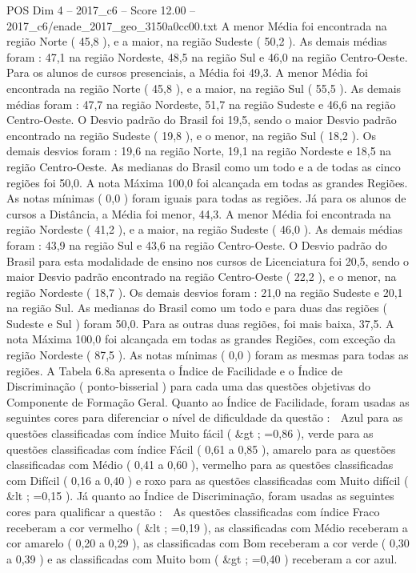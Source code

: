 \begin{textsample}{POS Dim 4 – 2017\_c6 – Score 12.00 – 2017\_c6/enade\_2017\_geo\_3150a0cc00.txt}
A menor Média foi encontrada na região Norte ( 45,8 ), e a maior, na região Sudeste ( 50,2 ).
As demais médias foram : 47,1 na região Nordeste, 48,5 na região Sul e 46,0 na região Centro-Oeste.
Para os alunos de cursos presenciais, a Média foi 49,3.
A menor Média foi encontrada na região Norte ( 45,8 ), e a maior, na região Sul ( 55,5 ).
As demais médias foram : 47,7 na região Nordeste, 51,7 na região Sudeste e 46,6 na região Centro-Oeste.
O Desvio padrão do Brasil foi 19,5, sendo o maior Desvio padrão encontrado na região Sudeste ( 19,8 ), e o menor, na região Sul ( 18,2 ).
Os demais desvios foram : 19,6 na região Norte, 19,1 na região Nordeste e 18,5 na região Centro-Oeste.
As medianas do Brasil como um todo e a de todas as cinco regiões foi 50,0.
A nota Máxima 100,0 foi alcançada em todas as grandes Regiões.
As notas mínimas ( 0,0 ) foram iguais para todas as regiões.
Já para os alunos de cursos a Distância, a Média foi menor, 44,3.
A menor Média foi encontrada na região Nordeste ( 41,2 ), e a maior, na região Sudeste ( 46,0 ).
As demais médias foram : 43,9 na região Sul e 43,6 na região Centro-Oeste.
O Desvio padrão do Brasil para esta modalidade de ensino nos cursos de Licenciatura foi 20,5, sendo o maior Desvio padrão encontrado na região Centro-Oeste ( 22,2 ), e o menor, na região Nordeste ( 18,7 ).
Os demais desvios foram : 21,0 na região Sudeste e 20,1 na região Sul.
As medianas do Brasil como um todo e para duas das regiões ( Sudeste e Sul ) foram 50,0.
Para as outras duas regiões, foi mais baixa, 37,5.
A nota Máxima 100,0 foi alcançada em todas as grandes Regiões, com exceção da região Nordeste ( 87,5 ).
As notas mínimas ( 0,0 ) foram as mesmas para todas as regiões.
A Tabela 6.8a apresenta o Índice de Facilidade e o Índice de Discriminação ( ponto-bisserial ) para cada uma das questões objetivas do Componente de Formação Geral.
Quanto ao Índice de Facilidade, foram usadas as seguintes cores para diferenciar o nível de dificuldade da questão :  Azul para as questões classificadas com índice Muito fácil ( \&gt ; =0,86 ), verde para as questões classificadas com índice Fácil ( 0,61 a 0,85 ), amarelo para as questões classificadas com Médio ( 0,41 a 0,60 ), vermelho para as questões classificadas com Difícil ( 0,16 a 0,40 ) e roxo para as questões classificadas com Muito difícil ( \&lt ; =0,15 ).
Já quanto ao Índice de Discriminação, foram usadas as seguintes cores para qualificar a questão :  As questões classificadas com índice Fraco receberam a cor vermelho ( \&lt ; =0,19 ), as classificadas com Médio receberam a cor amarelo ( 0,20 a 0,29 ), as classificadas com Bom receberam a cor verde ( 0,30 a 0,39 ) e as classificadas com Muito bom ( \&gt ; =0,40 ) receberam a cor azul.

\end{textsample}
